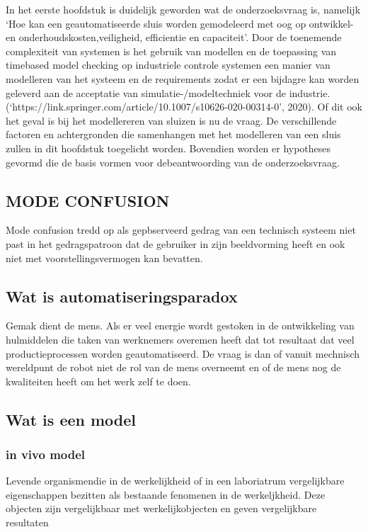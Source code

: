 In het eerste hoofdstuk is duidelijk geworden wat de onderzoeksvraag is, namelijk ‘Hoe kan een geautomatiseerde sluis worden gemodeleerd met oog op ontwikkel- en onderhoudskosten,veiligheid, efficientie en capaciteit’. Door de toenemende complexiteit van systemen is het gebruik van modellen en de toepassing van timebased model checking  op industriele controle systemen een manier van modelleren van het systeem en de requirements zodat er een bijdagre kan worden geleverd aan de acceptatie van  simulatie-/modeltechniek voor de industrie.(‘https://link.springer.com/article/10.1007/s10626-020-00314-0’, 2020). Of dit ook het geval is bij het modellereren van sluizen is nu de vraag.
De verschillende factoren en achtergronden die  samenhangen met het modelleren van een sluis zullen in dit hoofdstuk toegelicht worden. Bovendien worden er hypotheses gevormd die de basis vormen voor debeantwoording van de onderzoeksvraag. 




\subsection{MODE CONFUSION }
Mode confusion tredd op als gepbserveerd gedrag van een technisch systeem niet past in het gedragspatroon dat de gebruiker in zijn beeldvorming heeft  en ook niet met voorstellingsvermogen kan bevatten.
\subsection{Wat is automatiseringsparadox}
Gemak dient de mens. Als er veel energie wordt gestoken in de ontwikkeling van hulmiddelen die taken van werknemers overemen heeft dat tot resultaat dat veel productieprocessen worden geautomatiseerd. De vraag is dan of vanuit mechnisch wereldpunt de robot niet de rol van de mens overneemt en of de mens nog de kwaliteiten heeft om het werk zelf te doen.
\cite{bicker21102016automatiseringsparadox }
\cite{vseautoparadox }
\cite{blogxot21112016slimapparaat }


\subsection{Wat is een model}

\subsubsection{in vivo model}
Levende organismendie in de werkelijkheid of in een laboriatrum vergelijkbare eigenschappen bezitten als bestaande fenomenen in de werkeljkheid. Deze objecten zijn vergelijkbaar met werkelijkobjecten en geven vergelijkbare resultaten
